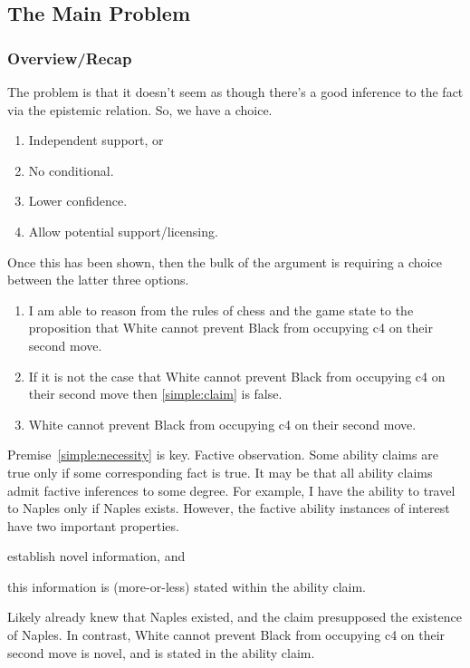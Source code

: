 \documentclass[10pt]{article}
\begin{document}
\subsection{The Main Problem}
\label{sec:problem}

\subsubsection{Overview/Recap}
\label{sec:overviewrecap}

\begin{note}[Overview]
  The problem is that it doesn't seem as though there's a good inference to the fact via the epistemic relation.
  So, we have a choice.
  \begin{enumerate}
  \item Independent support, or
  \item No conditional.
  \item Lower confidence.
  \item Allow potential support/licensing.
  \end{enumerate}
  Once this has been shown, then the bulk of the argument is requiring a choice between the latter three options.
\end{note}

\begin{enumerate}
\item\label{simple:claim} I am able to reason from the rules of chess and the game state to the proposition that White cannot prevent Black from occupying c4 on their second move.
\item\label{simple:necessity} If it is not the case that White cannot prevent Black from occupying c4 on their second move then \ref{simple:claim} is false.
\item\label{simple:focus} White cannot prevent Black from occupying c4 on their second move.
\end{enumerate}

Premise~\ref{simple:necessity} is key.
Factive observation.
Some ability claims are true only if some corresponding fact is true.
It may be that all ability claims admit factive inferences to some degree.
For example, I have the ability to travel to Naples only if Naples exists.
However, the factive ability instances of interest have two important properties.
\begin{enumerate*}
\item establish novel information, and
\item this information is (more-or-less) stated within the ability claim.
\end{enumerate*}
Likely already knew that Naples existed, and the claim presupposed the existence of Naples.
In contrast, White cannot prevent Black from occupying c4 on their second move is novel, and is stated in the ability claim.
\end{document}
